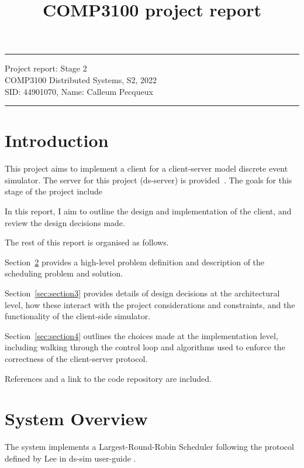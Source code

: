 \documentclass[a4paper]{article} %
\begin{document}

\title{COMP3100 project report} %
\fancyhead[C]{}
\hrule \medskip %
\begin{minipage}{1\textwidth} %
\centering 
\large %
Project report: Stage 2\\ %
COMP3100 Distributed Systems, S2, 2022\\
\normalsize %
SID: 44901070, Name: Calleum Pecqueux
\end{minipage}
\medskip\hrule %
\bigskip

\section{Introduction}
This project aims to implement a client for a client-server model discrete event
simulator. The server for this project (ds-server) is
provided~\cite{mq-dist-github}. The goals for this stage of the project include

In this report, I aim to outline the design and implementation of the client,
and review the design decisions made. 

The rest of this report is organised as follows. 

Section~\ref{sec:section2}
provides a high-level problem definition and description of the scheduling
problem and solution. 

Section~\ref{sec:section3} provides details of design decisions at the
architectural level, how these interact with the project considerations 
and constraints, and the functionality of the client-side simulator.

Section~\ref{sec:section4} outlines the choices made at the implementation
level, including walking through the control loop and algorithms used to enforce
the correctness of the client-server protocol.

References and a link to the code repository \cite{calleum-ds-sim} are included.

\section{System Overview }
\label{sec:section2}
The system implements a Largest-Round-Robin Scheduler following the protocol
defined by Lee in ds-sim user-guide \cite{mq-dist-github-userguide}.
\end{document}

